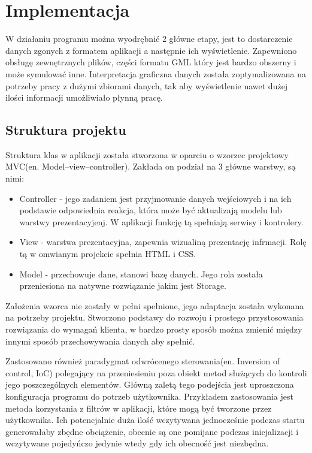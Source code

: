 ﻿\chapter{Implementacja}
\label{cha:implementacja}

W działaniu programu można wyodrębnić 2 główne etapy, jest to dostarczenie danych zgonych z formatem aplikacji a następnie ich wyświetlenie. Zapewniono obsługę zewnętrznych plików, części formatu GML który jest bardzo obszerny i może symulować inne. Interpretacja graficzna danych została zoptymalizowana na potrzeby pracy z dużymi zbiorami danych, tak aby wyświetlenie nawet dużej ilości informacji umożliwiało płynną pracę.


\section{Struktura projektu}
\label{sec:structure}

Struktura klas w aplikacji została stworzona w oparciu o wzorzec projektowy MVC(en. Model–view–controller). Zakłada on podział na 3 główne warstwy, są nimi:

\begin{itemize}
\item
Controller - jego zadaniem jest przyjmowanie danych wejściowych i na ich podstawie odpowiednia reakcja, która może być aktualizają modelu lub warstwy prezentacyjenj.  W aplikacji funkcję tą spełniają serwisy i kontrolery.
\item
View - warstwa prezentacyjna, zapewnia wizualiną prezentację infrmacji. Rolę tą w omwianym projekcie spełnia HTML i CSS.
\item
Model - przechowuje dane, stanowi bazę danych. Jego rola została przeniesiona na natywne rozwiązanie jakim jest Storage.
\end{itemize}

Założenia wzorca nie zostały w pełni spełnione, jego adaptacja została wykonana na potrzeby projektu. Stworzono podstawy do rozwoju i prostego przystosowania rozwiązania do wymagań klienta, w bardzo prosty sposób można zmienić między innymi sposób przechowywania danych aby spełnić.


Zastosowano również paradygmat odwrócenego sterowania(en. Inversion of control, IoC) polegający na przeniesieniu poza obiekt metod służących do kontroli jego poszczególnych elementów. Główną zaletą tego podejścia jest uproszczona konfiguracja programu do potrzeb użytkownika. Przykładem zastosowania jest metoda korzystania z filtrów w aplikacji, które mogą być tworzone przez użytkownika. Ich potencjalnie duża ilość wczytywana jednocześnie podczas startu generowałaby zbędne obciążenie, obecnie są one pomijane podczas inicjalizacji i wczytywane pojedyńczo jedynie wtedy gdy ich obecność jest niezbędna.


